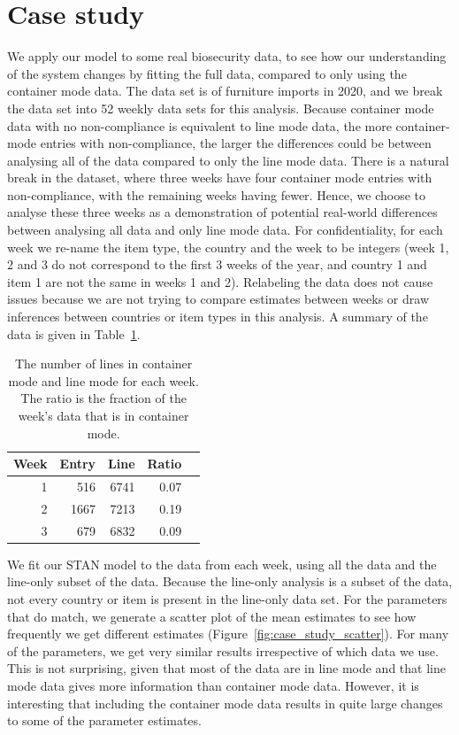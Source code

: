 \documentclass{article}
\begin{document}
\section{Case study}
We apply our model to some real biosecurity data, to see how our understanding of the system changes by fitting the full data, compared to only using the container mode data. The data set is of furniture imports in 2020, and we break the data set into 52 weekly data sets for this analysis. Because container mode data with no non-compliance is equivalent to line mode data, the more container-mode entries with non-compliance, the larger the differences could be between analysing all of the data compared to only the line mode data. There is a natural break in the dataset, where three weeks have four container mode entries with non-compliance, with the remaining weeks having fewer. Hence, we choose to analyse these three weeks as a demonstration of potential real-world differences between analysing all data and only line mode data. For confidentiality, for each week we re-name the item type, the country and the week to be integers (week 1, 2 and 3 do not correspond to the first 3 weeks of the year, and country 1 and item 1 are not the same in weeks 1 and 2). Relabeling the data does not cause issues because we are not trying to compare estimates between weeks or draw inferences between countries or item types in this analysis. A summary of the data is given in Table~\ref{tab:real_data_summary}.

\begin{table}[ht]
\caption{The number of lines in container mode and line mode for each week. The ratio is the fraction of the week's data that is in container mode.}
\label{tab:real_data_summary}
\centering
\begin{tabular}{rrrrr}
  \hline
 Week & Entry & Line & Ratio  \\ 
  \hline
 1 & 516 & 6741 & 0.07 \\ 
  2 & 1667 & 7213 & 0.19 \\ 
   3 & 679 & 6832 & 0.09 \\ 
   \hline
\end{tabular}
\end{table}


We fit our STAN model to the data from each week, using all the data and the line-only subset of the data. Because the line-only analysis is a subset of the data, not every country or item is present in the line-only data set. For the parameters that do match, we generate a scatter plot of the mean estimates to see how frequently we get different estimates (Figure~\ref{fig:case_study_scatter}). For many of the parameters, we get very similar results irrespective of which data we use. This is not surprising, given that most of the data are in line mode and that line mode data gives more information than container mode data. However, it is interesting that including the container mode data results in quite large changes to some of the parameter estimates. 
\end{document}
